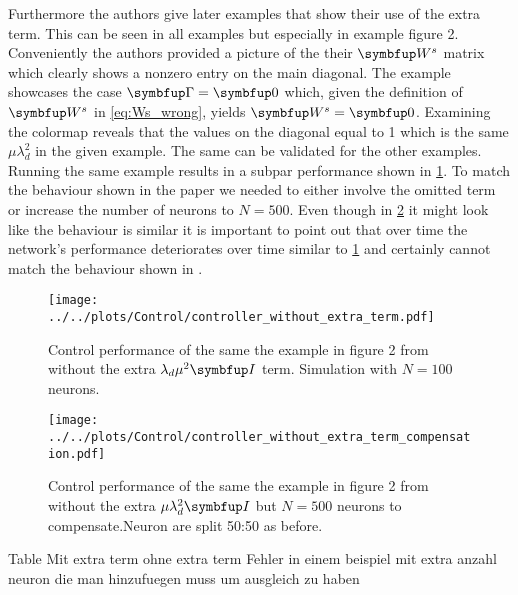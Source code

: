 Furthermore the authors give later examples that show their use of the extra term.
This can be seen in all examples but especially in example figure 2. Conveniently the authors provided a picture of the their $\bmu{W}^s$ matrix which clearly shows a nonzero entry on the main diagonal. The example showcases the case $\bmu{\Gamma} = \bmu{0}$ which, given the definition of $\bmu{W}^s$ in \cref{eq:Ws_wrong}, yields $\bmu{W}^s = \bmu{0}$. Examining the colormap reveals that the values on the diagonal equal to 1 which is the same $\mu\lambda_d^2$ in the given example. The same can be validated for the other examples.\\
Running the same example results in a subpar performance shown in \cref{fig:bad_Ws}. To match the behaviour shown in the paper we needed to either involve the omitted term or increase the number of neurons to $N= 500$. Even though in \cref{fig:bad_Ws_compensated} it might look like the behaviour is similar it is important to point out that over time the network's performance deteriorates over time similar to \cref{fig:bad_Ws} and certainly cannot match the behaviour shown in \cite{huang_optimizing_2017}.
\begin{figure}[h!]
	\centering
	\texttt{[image: ../../plots/Control/controller\_without\_extra\_term.pdf]}
	\caption{Control performance of the same the example in figure 2 from \cite{huang_optimizing_2017} without the extra $\lambda_d\mu^2\bmu{I}$ term. Simulation with $N=100$ neurons.}
	\label{fig:bad_Ws}
\end{figure}


\begin{figure}[h!]
	\centering
	\texttt{[image: ../../plots/Control/controller\_without\_extra\_term\_compensation.pdf]}
	\caption{Control performance of the same the example in figure 2 from \cite{huang_optimizing_2017} without the extra $\mu\lambda_d^2\bmu{I}$ but $N=500$ neurons to compensate.Neuron are split 50:50 as before.}
	\label{fig:bad_Ws_compensated}
\end{figure}



Table
Mit extra term
ohne extra term
 Fehler in einem beispiel mit extra
 anzahl neuron die man hinzufuegen muss um ausgleich zu haben


